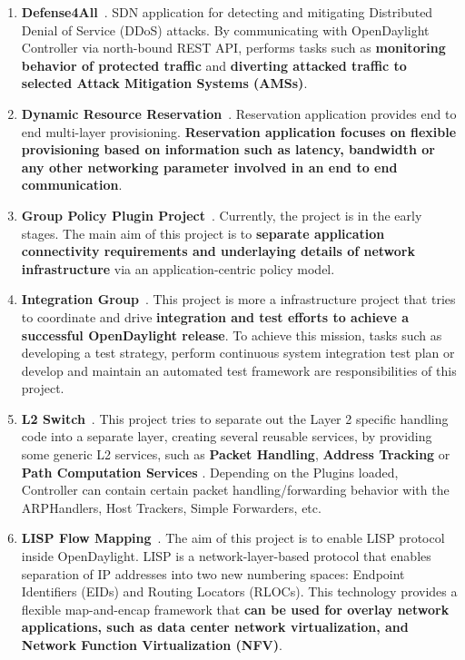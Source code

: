 \documentclass[a4paper, 12pt]{book}
\begin{document}
\begin{enumerate}
\item{\textbf{Defense4All}}~\cite{OpenDaylightWikiDefense4All}. SDN application for detecting and mitigating Distributed Denial of Service (DDoS) attacks. By communicating with OpenDaylight Controller via north-bound REST API, performs tasks such as \textbf{monitoring behavior of protected traffic} and \textbf{diverting attacked traffic to selected Attack Mitigation Systems (AMSs)}.
\item{\textbf{Dynamic Resource Reservation}}~\cite{OpenDaylightWikiReservation}. Reservation application provides end to end multi-layer provisioning. \textbf{Reservation application focuses on flexible provisioning based on information such as latency, bandwidth or any other networking parameter involved in an end to end communication}.
\item{\textbf{Group Policy Plugin Project}}~\cite{OpenDaylightWikiGroupPolicy}. Currently, the project is in the early stages. The main aim of this project is to \textbf{separate application connectivity requirements and underlaying details of network infrastructure} via an application-centric policy model.
\item{\textbf{Integration Group}}~\cite{OpenDaylightWikiIntegration}. This project is more a infrastructure project that tries to coordinate and drive \textbf{integration and test efforts to achieve a successful OpenDaylight release}. To achieve this mission, tasks such as developing a test strategy, perform continuous system integration test plan or develop and maintain an automated test framework are responsibilities of this project.
\item{\textbf{L2 Switch}}~\cite{OpenDaylightWikiL2Switch}. This project tries to separate out the Layer 2 specific handling code into a separate layer, creating several reusable services, by providing some generic L2 services, such as \textbf{Packet Handling}, \textbf{Address Tracking} or \textbf{Path Computation Services} . Depending on the Plugins loaded, Controller can contain certain packet handling/forwarding behavior with the ARPHandlers, Host Trackers, Simple Forwarders, etc.
\item{\textbf{LISP Flow Mapping}}~\cite{OpenDaylightWikiLISP}. The aim of this project is to enable LISP protocol~\cite{LISP} inside OpenDaylight. LISP is a network-layer-based protocol that enables separation of IP addresses into two new numbering spaces: Endpoint Identifiers (EIDs) and Routing Locators (RLOCs). This technology provides a flexible map-and-encap framework that \textbf{can be used for overlay network applications, such as data center network virtualization, and Network Function Virtualization (NFV)}.

\end{enumerate}
\end{document}
